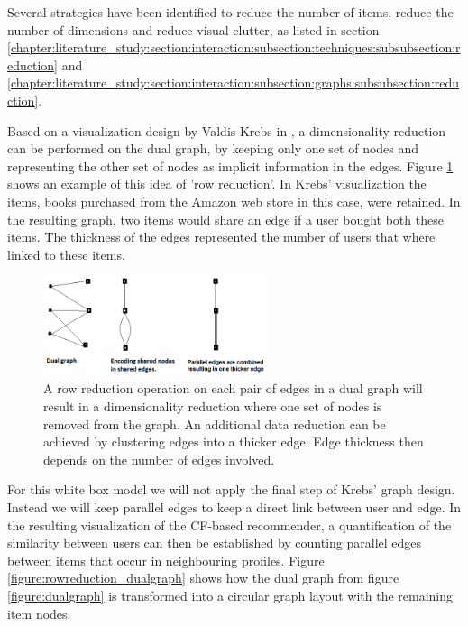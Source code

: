 Several strategies have been identified to reduce the number of items, reduce the number of dimensions and reduce visual clutter, as listed in section \ref{chapter:literature_study:section:interaction:subsection:techniques:subsubsection:reduction} and \ref{chapter:literature_study:section:interaction:subsection:graphs:subsubsection:reduction}.

Based on a visualization design by Valdis Krebs in \cite{steele:2010}, a dimensionality reduction can be performed on the dual graph, by keeping only one set of nodes and representing the other set of nodes as implicit information in the edges. Figure \ref{figure:rowreduction} shows an example of this idea of 'row reduction'. In Krebs' visualization the items, books purchased from the Amazon web store in this case, were retained. In the resulting graph, two items would share an edge if a user bought both these items. The thickness of the edges represented the number of users that where linked to these items\cite{krebs:2012:networkthinkers, steele:2010}.

\begin{figure}%
	\begin{center}
		\includegraphics[width=250px]{img/row_reduction}%
	\end{center}
	\caption{A row reduction operation on each pair of edges in a dual graph will result in a dimensionality reduction where one set of nodes is removed from the graph. An additional data reduction can be achieved by clustering edges into a thicker edge. Edge thickness then depends on the number of edges involved.}%
	\label{figure:rowreduction}%
\end{figure}

For this white box model we will not apply the final step of Krebs' graph design. Instead we will keep parallel edges to keep a direct link between user and edge. In the resulting visualization of the CF-based recommender, a quantification of the similarity between users can then be established by counting parallel edges between items that occur in neighbouring profiles. Figure \ref{figure:rowreduction_dualgraph} shows how the dual graph from figure \ref{figure:dualgraph} is transformed into a circular graph layout with the remaining item nodes.

